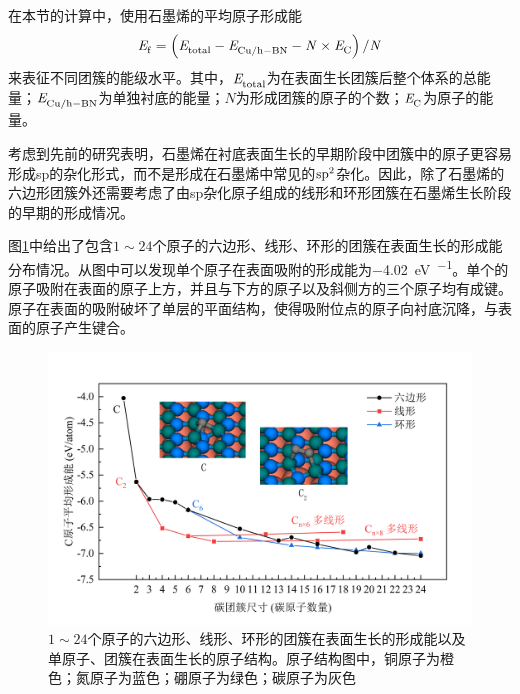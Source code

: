     在本节的计算中，使用石墨烯的平均原子形成能
    $$\it E_{\rm f}^{\rm } \it=\left(\it E_{\rm total}^{\rm } \it-\it E_{\rm Cu/h-BN}^{\rm } \it-N\times \it E_{\rm C}^{\rm } \it\right)\slash N$$
    来表征不同团簇的能级水平。其中，$\it E_{\rm total}^{\rm } \it$为在表面生长团簇后整个体系的总能量；$\it E_{\rm Cu/h-BN}^{\rm } \it$为单独衬底的能量；$N$为形成团簇的原子的个数；$\it E_{\rm C}^{\rm } \it$为原子的能量。

    考虑到先前的研究表明，石墨烯在衬底表面生长的早期阶段中团簇中的原子更容易形成sp的杂化形式，而不是形成在石墨烯中常见的$\rm sp^2$杂化。因此，除了石墨烯的六边形团簇外还需要考虑了由sp杂化原子组成的线形和环形团簇在石墨烯生长阶段的早期的形成情况。

    图\ref{fig:CG_DFT_C_cluster_onBN}中给出了包含$1 \sim 24$个原子的六边形、线形、环形的团簇在表面生长的形成能分布情况。从图中可以发现单个原子在表面吸附的形成能为\SI{-4.02}{\electronvolt\per\atom}。单个的原子吸附在表面的原子上方，并且与下方的原子以及斜侧方的三个原子均有成键。原子在表面的吸附破坏了单层的平面结构，使得吸附位点的原子向衬底沉降，与表面的原子产生键合。


    \begin{figure}[htb]
        \includegraphics{pic/CG_DFT_C_cluster_onBN.png}
        \caption{$1 \sim 24$个原子的六边形、线形、环形的团簇在表面生长的形成能以及单原子、团簇在表面生长的原子结构。原子结构图中，铜原子为橙色；氮原子为蓝色；硼原子为绿色；碳原子为灰色}
        \label{fig:CG_DFT_C_cluster_onBN}
    \end{figure}

